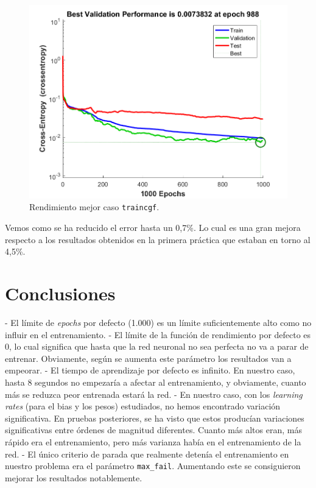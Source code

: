 \documentclass[a4paper,12pt,titlepage]{article}
\begin{document}
\begin{figure}[!ht]
	\centering
	\label{fig:traincgb}
	\includegraphics[width=\textwidth]{traincgf560000405.png}
	\caption{Rendimiento mejor caso \lstinline|traincgf|.}
\end{figure}

Vemos como se ha reducido el error hasta un 0,7\%. Lo cual es una gran mejora respecto a los resultados obtenidos en la primera práctica que estaban en torno al 4,5\%.

\section{Conclusiones}

- El límite de \textit{epochs} por defecto (1.000) es un límite suficientemente alto como no influir en el entrenamiento.
- El límite de la función de rendimiento por defecto es 0, lo cual significa que hasta que la red neuronal no sea perfecta no va a parar de entrenar. Obviamente, según se aumenta este parámetro los resultados van a empeorar.
- El tiempo de aprendizaje por defecto es infinito. En nuestro caso, hasta 8 segundos no empezaría a afectar al entrenamiento, y obviamente, cuanto más se reduzca peor entrenada estará la red.
- En nuestro caso, con los \textit{learning rates} (para el bias y los pesos) estudiados, no hemos encontrado variación significativa. En pruebas posteriores, se ha visto que estos producían variaciones significativas entre órdenes de magnitud diferentes. Cuanto más altos eran, más rápido era el entrenamiento, pero más varianza había en el entrenamiento de la red.
- El único criterio de parada que realmente detenía el entrenamiento en nuestro problema era el parámetro \lstinline|max_fail|. Aumentando este se consiguieron mejorar los resultados notablemente.



\end{document}
